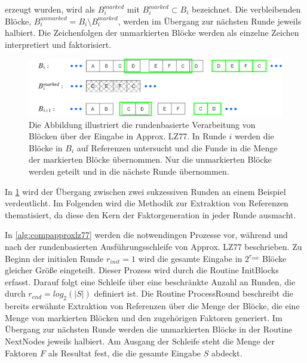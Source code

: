 erzeugt wurden, wird als $B_i^{marked}$ mit $B_i^{marked}\subset B_i$ bezeichnet. Die verbleibenden Blöcke, $B_i^{unmarked}=B_i\setminus B_i^{marked}$, werden im Übergang
zur nächsten Runde jeweils halbiert. Die Zeichenfolgen der unmarkierten Blöcke werden als einzelne Zeichen interpretiert und faktorisiert.
\begin{figure} [ht]
    \centering
    \includegraphics[width=1\textwidth]{Images/approxlz77.png}
    \caption{Die Abbildung illustriert die rundenbasierte Verarbeitung von Blöcken über der Eingabe in Approx. LZ77. In Runde $i$ werden die Blöcke in $B_i$ auf Referenzen untersucht und
    die Funde in die Menge der markierten Blöcke übernommen. Nur die unmarkierten Blöcke werden geteilt und in die nächste Runde übernommen.}
    \label{fig:roundapproxlz77}
\end{figure}

In \ref{fig:roundapproxlz77} wird der Übergang zwischen zwei sukzessiven Runden an einem Beispiel verdeutlicht. Im Folgenden wird die Methodik zur Extraktion von Referenzen
thematisiert, da diese den Kern der Faktorgeneration in jeder Runde ausmacht.

In \ref{alg:compapproxlz77} werden die notwendingen Prozesse vor, während und nach der rundenbasierten Ausführungsschleife von Approx. LZ77 beschrieben. Zu Beginn der initialen
Runde $r_{init}=1$ wird die gesamte Eingabe in $2^{r_{init}}$ Blöcke gleicher Größe eingeteilt. Dieser Prozess wird durch die Routine InitBlocks erfasst. Darauf folgt eine Schleife
über eine beschränkte Anzahl an Runden, die durch $r_{end}=log_2(|S|)$ definiert ist. Die Routine ProcessRound beschreibt die bereits erwähnte Extraktion von Referenzen über die
Menge der Blöcke, die eine Menge von markierten Blöcken und den zugehörigen Faktoren generiert. Im Übergang zur nächsten Runde werden die unmarkierten Blöcke in der Routine 
NextNodes jeweils halbiert. Am Ausgang der Schleife steht die Menge der Faktoren $F$ als Resultat fest, die die gesamte Eingabe $S$ abdeckt.

